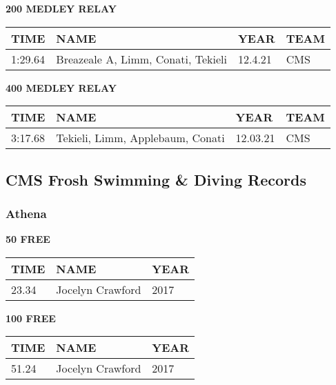 \vspace{0.4cm}

\begin{center}
\begin{minipage}[t]{0.7\textwidth}
\centering
\textbf{200 MEDLEY RELAY}\\[0.05cm]
\begin{tabular}{@{}p{1.8cm}p{2.8cm}p{1.2cm}p{1.4cm}@{}}
\hline
\textbf{TIME} & \textbf{NAME} & \textbf{YEAR} & \textbf{TEAM} \\
\hline
1:29.64 & Breazeale A, Limm, Conati, Tekieli & 12.4.21 & CMS \\
\hline
\end{tabular}
\end{minipage}
\end{center}

\vspace{0.4cm}

\begin{center}
\begin{minipage}[t]{0.7\textwidth}
\centering
\textbf{400 MEDLEY RELAY}\\[0.05cm]
\begin{tabular}{@{}p{1.8cm}p{2.8cm}p{1.2cm}p{1.4cm}@{}}
\hline
\textbf{TIME} & \textbf{NAME} & \textbf{YEAR} & \textbf{TEAM} \\
\hline
3:17.68 & Tekieli, Limm, Applebaum, Conati & 12.03.21 & CMS \\
\hline
\end{tabular}
\end{minipage}
\end{center}

\vspace{0.4cm}

\newpage

\subsection{CMS Frosh Swimming \& Diving Records}
\subsubsection{Athena}

\begin{minipage}[t]{0.48\textwidth}
\centering
\textbf{50 FREE}\\[0.05cm]
\begin{tabular}{@{}p{1.8cm}p{2.8cm}p{1.2cm}@{}}
\hline
\textbf{TIME} & \textbf{NAME} & \textbf{YEAR} \\
\hline
23.34 & Jocelyn Crawford & 2017 \\
\hline
\end{tabular}
\end{minipage}\hfill
\begin{minipage}[t]{0.48\textwidth}
\centering
\textbf{100 FREE}\\[0.05cm]
\begin{tabular}{@{}p{1.8cm}p{2.8cm}p{1.2cm}@{}}
\hline
\textbf{TIME} & \textbf{NAME} & \textbf{YEAR} \\
\hline
51.24 & Jocelyn Crawford & 2017 \\
\hline
\end{tabular}
\end{minipage}

